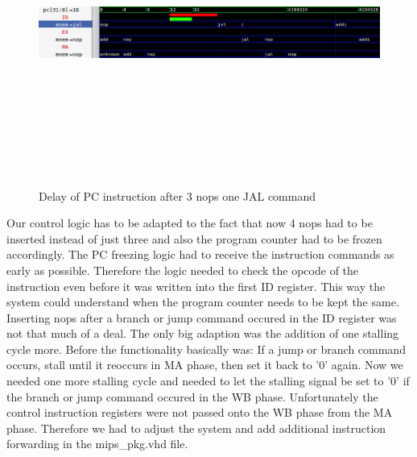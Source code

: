 \begin{figure}[ht]
	\centering
  \includegraphics[width=1\textwidth, height=10cm, keepaspectratio]{pictures/task3_delayOfPCInstruction}
	\caption{Delay of PC instruction after 3 nops one JAL command}
	\label{fig3-5}
\end{figure}




	
Our control logic has to be adapted to the fact that now 4 nops had to be inserted instead of just three and also the program counter had to be frozen accordingly.
The PC freezing logic had to receive the instruction commands as early as possible. Therefore the logic needed to check the opcode of the instruction even before it was written into the first ID register. This way the system could understand when the program counter needs to be kept the same. Inserting nops after a branch or jump command occured in the ID register was not that much of a deal. The only big adaption was the addition of one stalling cycle more. Before the functionality basically was: If a jump or branch command occurs, stall until it reoccurs in MA phase, then set it back to '0' again. Now we needed one more stalling cycle and needed to let the stalling signal be set to '0' if the branch or jump command occured in the WB phase. Unfortunately the control instruction registers were not passed onto the WB phase from the MA phase. Therefore we had to adjust the system and add additional instruction forwarding in the mips\_pkg.vhd file.


